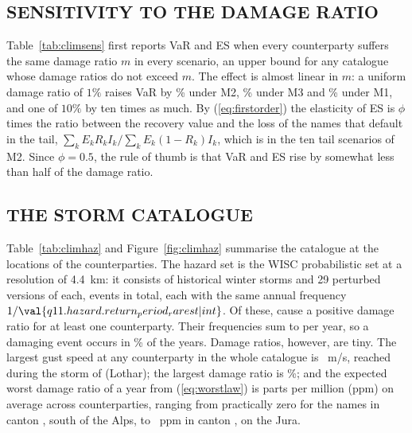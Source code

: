 \subsection{SENSITIVITY TO THE DAMAGE RATIO}
Table~\ref{tab:climsens} first reports VaR and ES when every counterparty suffers the same damage ratio $m$ in every scenario, an upper bound for any catalogue whose damage ratios do not exceed $m$. The effect is almost linear in $m$: a uniform damage ratio of $1\%$ raises VaR by \% under M2, \% under M3 and \% under M1, and one of $10\%$ by ten times as much. By (\ref{eq:firstorder}) the elasticity of ES is $\phi$ times the ratio between the recovery value and the loss of the names that default in the tail, $\sum_kE_kR_kI_k/\sum_kE_k(1-R_k)I_k$, which is  in the ten tail scenarios of M2. Since $\phi=0.5$, the rule of thumb is that VaR and ES rise by somewhat less than half of the damage ratio.

\begin{table}[tb]
\caption{Upper-bound sensitivity: increase of the $99.9\%$ VaR and ES (in \%, $N=10{,}000$, thresholds $\dhat$) when all counterparties suffer the same mean damage ratio $m$ in every scenario, $\phi_k=0.5$.}
\label{tab:climsens}
\centering
{}
\end{table}

\subsection{THE STORM CATALOGUE}
Table~\ref{tab:climhaz} and Figure~\ref{fig:climhaz} summarise the catalogue at the locations of the counterparties. The hazard set is the WISC probabilistic set at a resolution of 4.4~km: it consists of  historical winter storms and 29 perturbed versions of each,  events in total, each with the same annual frequency $1/\val{q11.hazard.return_period_rarest|int}$. Of these,  cause a positive damage ratio for at least one counterparty. Their frequencies sum to  per year, so a damaging event occurs in \% of the years. Damage ratios, however, are tiny. The largest gust speed at any counterparty in the whole catalogue is ~m/s, reached during the storm of  (Lothar); the largest damage ratio is \%; and the expected worst damage ratio of a year from (\ref{eq:worstlaw}) is  parts per million (ppm) on average across counterparties, ranging from practically zero for the names in canton , south of the Alps, to ~ppm in canton , on the Jura.

